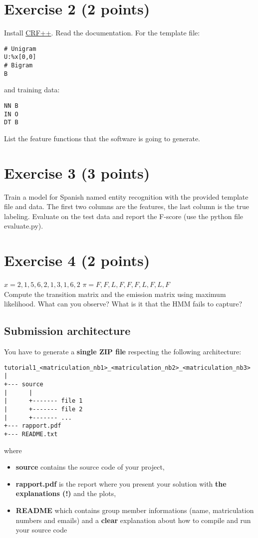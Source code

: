 \documentclass[a4paper,12pt]{article}
\begin{document}
\section*{\bf Exercise 2 (2 points)} 
Install \href{https://taku910.github.io/crfpp/}{CRF++}. Read the documentation. For the template file: \\
\begin{lstlisting}
# Unigram
U:%x[0,0]
# Bigram
B
\end{lstlisting}
 and training data: \\
\begin{lstlisting}
NN B
IN O
DT B
\end{lstlisting}

List the feature functions that the software is going to generate. 

\section*{\bf Exercise 3 (3 points)} 
Train a model for Spanish named entity recognition with the provided template file and data. The first two columns are the features, the last column is the true labeling.  Evaluate on the test data and report the F-score (use the python file evaluate.py). 

\section*{\bf Exercise 4 (2 points)}
$x = 2,1,5,6,2,1,3,1,6,2$ $ \pi = F, F, L, F, F, F, L, F, L, F$ \\
Compute the transition matrix and the emission matrix using maximum likelihood. What can you observe? What is it that the HMM fails to capture?

\newpage
\subsection*{Submission architecture}
\label{sec:subm-arch}

You have to generate a \textbf{single ZIP file} respecting the following architecture:

\begin{Verbatim}[frame=lines, framesep=3mm]
tutorial1_<matriculation_nb1>_<matriculation_nb2>_<matriculation_nb3>
|
+--- source
|      |
|      +------- file 1
|      +------- file 2
|      +------- ...
+--- rapport.pdf
+--- README.txt
\end{Verbatim}
where
\begin{itemize}
    \item \textbf{source} contains the source code of your project,
    \item \textbf{rapport.pdf} is the report where you present your solution with \textbf{the
        explanations (!)} and the plots,
    \item \textbf{README} which contains group member informations (name, matriculation numbers and
    emails) and a \textbf{clear} explanation about how to compile and run your source code
\end{itemize}
\end{document}
